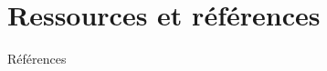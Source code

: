 \documentclass[allowframebreaks,9pt]{beamer}
\begin{document}
\section{Ressources et r\'ef\'erences}
  

\begin{frame}[allowframebreaks]{R\'ef\'erences} 
\nocite{*}

\end{frame}



\end{document}
